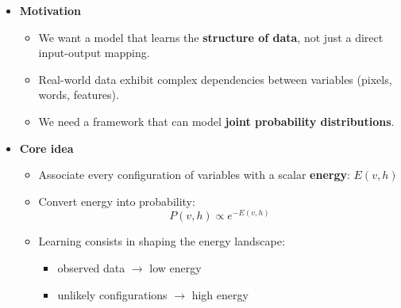 \documentclass[xcolor=table]{beamer}
\begin{document}
	\begin{subsectionframe}
		\begin{itemize}
			
			\item \textbf{Motivation}
			\begin{itemize}
				\item We want a model that learns the \textbf{structure of data}, not just a direct input-output mapping.
				\item Real-world data exhibit complex dependencies between variables (pixels, words, features).
				\item We need a framework that can model \textbf{joint probability distributions}.
			\end{itemize}
			
			\item \textbf{Core idea}
			\begin{itemize}
				\item Associate every configuration of variables with a scalar \textbf{energy}: $E(v, h)$
				\item Convert energy into probability:
				\[
				P(v, h) \propto e^{-E(v,h)}
				\]
				\item Learning consists in shaping the energy landscape:
				\begin{itemize}
					\item observed data $\rightarrow$ low energy
					\item unlikely configurations $\rightarrow$ high energy
				\end{itemize}
			\end{itemize}
			
		\end{itemize}
	\end{subsectionframe}
	
\end{document}
